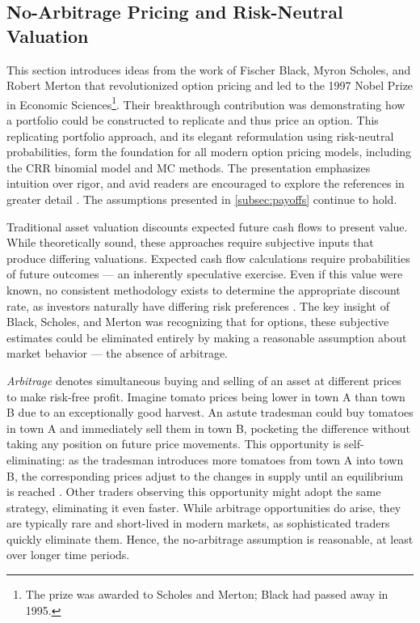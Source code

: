 \documentclass[english,12pt,a4paper,pdftex,sci,utf8]{aaltothesis}
\begin{document}
\subsection{No-Arbitrage Pricing and Risk-Neutral Valuation}\label{sec:risk-neutral-theory}

This section introduces ideas from the work of Fischer Black, Myron Scholes, and Robert Merton that revolutionized option pricing and led to the 1997 Nobel Prize in Economic Sciences\footnote{The prize was awarded to Scholes and Merton; Black had passed away in 1995.}. Their breakthrough contribution was demonstrating how a portfolio could be constructed to replicate and thus price an option. This replicating portfolio approach, and its elegant reformulation using risk-neutral probabilities, form the foundation for all modern option pricing models, including the CRR binomial model and MC methods. The presentation emphasizes intuition over rigor, and avid readers are encouraged to explore the references in greater detail \cite{hull2018, gisiger2010risk, tham2001risk}. The assumptions presented in \cref{subsec:payoffs} continue to hold.

Traditional asset valuation discounts expected future cash flows to present value. While theoretically sound, these approaches require subjective inputs that produce differing valuations. Expected cash flow calculations require probabilities of future outcomes --- an inherently speculative exercise. Even if this value were known, no consistent methodology exists to determine the appropriate discount rate, as investors naturally have differing risk preferences \cite{nobel1997}. The key insight of Black, Scholes, and Merton was recognizing that for options, these subjective estimates could be eliminated entirely by making a reasonable assumption about market behavior --- the absence of arbitrage.

\emph{Arbitrage} denotes simultaneous buying and selling of an asset at different prices to make risk-free profit. Imagine tomato prices being lower in town A than town B due to an exceptionally good harvest. An astute tradesman could buy tomatoes in town A and immediately sell them in town B, pocketing the difference without taking any position on future price movements. This opportunity is self-eliminating: as the tradesman introduces more tomatoes from town A into town B, the corresponding prices adjust to the changes in supply until an equilibrium is reached \cite{hull2018, wilmott2013paul}. Other traders observing this opportunity might adopt the same strategy, eliminating it even faster. While arbitrage opportunities do arise, they are typically rare and short-lived in modern markets, as sophisticated traders quickly eliminate them. Hence, the no-arbitrage assumption is reasonable, at least over longer time periods.
\end{document}
